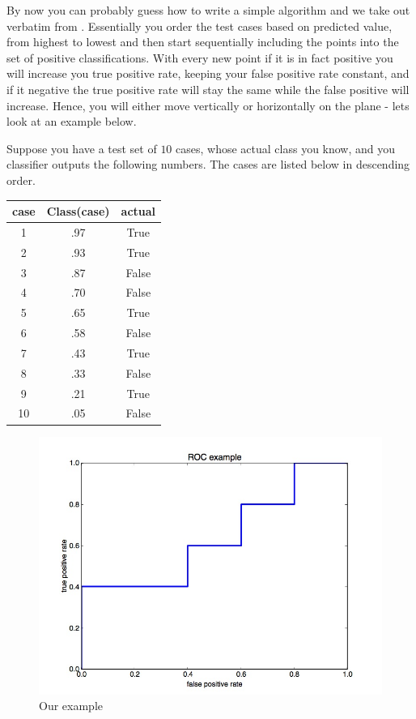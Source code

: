 By now you can probably guess how to write a simple  algorithm and we take out verbatim from \cite{ROC}. Essentially you order the test cases based on predicted value, from highest to lowest and then start sequentially including the points into the set of positive classifications. With every new point if it is in fact positive you will increase you true positive rate, keeping your false positive rate constant, and if it negative the true positive rate will stay the same while the false positive will increase. Hence, you will either move vertically or horizontally on the plane - lets look at an example below. 

\begin{example}

    Suppose you have a test set of $10$ cases, whose actual class you know, and you classifier outputs the following numbers. The cases are listed below in descending order. 


\begin{center}
    \begin{tabular}{c|c|c}
        \hline
        case & Class(case) & actual \\ \hline
        1 & .97 & True \\ \hline 
        2 & .93 & True \\ \hline 
        3 & .87 & False \\ \hline 
        4 & .70 & False \\ \hline 
        5 & .65 & True \\ \hline 
        6 & .58 & False \\ \hline 
        7 & .43 & True \\ \hline 
        8 & .33 & False \\ \hline 
        9 & .21 & True \\ \hline 
        10 & .05 & False \\ \hline         
    \end{tabular}
\end{center}


\begin{figure}
  \label{class:rocEx}  
  \includegraphics[width=\textwidth,height=.45\textheight]{../images/rocEx}
  \caption{Our example }
\end{figure}


\end{example}
